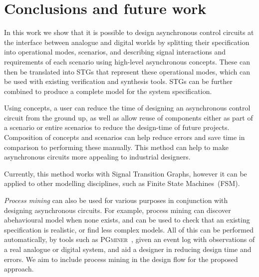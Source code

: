 \documentclass[british, journal]{IEEEtran}
\newcommand{\noun}[1]{\textsc{#1}}
\begin{document}

\section{Conclusions and future work\label{sec:conclusions}}

In this work we show that it is possible to design asynchronous control
circuits at the interface between analogue and digital worlds by
splitting their specification into operational modes, scenarios, and
describing signal interactions and requirements of each scenario using
high-level asynchronous concepts. These can then be translated into STGs
that represent these operational modes, which can be used with existing
verification and synthesis tools. STGs can be further combined to
produce a complete model for the system specification.

Using concepts, a user can reduce the time of designing an asynchronous
control circuit from the ground up, as well as allow reuse of components
either as part of a scenario or entire scenarios to reduce the design-time
of future projects. Composition of concepts and scenarios can help
reduce errors and save time in comparison to performing these manually.
This method can help to make asynchronous circuits more appealing
to industrial designers.

Currently, this method works with Signal Transition Graphs, however
it can be applied to other modelling disciplines, such as Finite State
Machines~(FSM).

\emph{Process mining} can also be used for various purposes in conjunction
with designing asynchronous circuits. For example, process mining can discover abehavioural model when none exists, and can be used to check that an existing
specification is realistic, or find less complex models. All of this can be
performed automatically, by tools such as
\noun{PGminer}~\cite{mokhov2016mining}, given
an event log with observations of a real analogue or digital system, and aid a
designer in reducing design time and errors. We aim to include process mining
in the design flow for the proposed approach.
\end{document}
